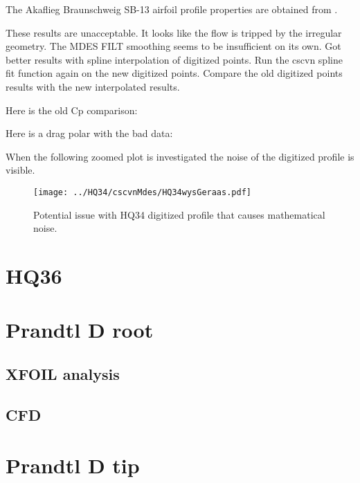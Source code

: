 \documentclass{article}
\begin{document}

The Akaflieg Braunschweig SB-13 airfoil profile properties are obtained from \cite{SB13Aerodynamics}.


These results are unacceptable.  It looks like the flow is tripped by the irregular geometry.  The MDES FILT smoothing seems to be insufficient on its own.  Got better results with spline interpolation of digitized points.
Run the cscvn spline fit function again on the new digitized points.  Compare the old digitized points results with the new interpolated results.


Here is the old Cp comparison:



Here is a drag polar with the bad data:


When the following zoomed plot is investigated the noise of the digitized profile is visible.

\begin{figure}[H]
\centering
\texttt{[image: ../HQ34/cscvnMdes/HQ34wysGeraas.pdf]}
\caption{Potential issue with HQ34 digitized profile that causes mathematical noise.}
\end{figure}

\section{HQ36}


\section{Prandtl D root}

\subsection{XFOIL analysis}

\subsection{CFD}

\section{Prandtl D tip}





\end{document}
